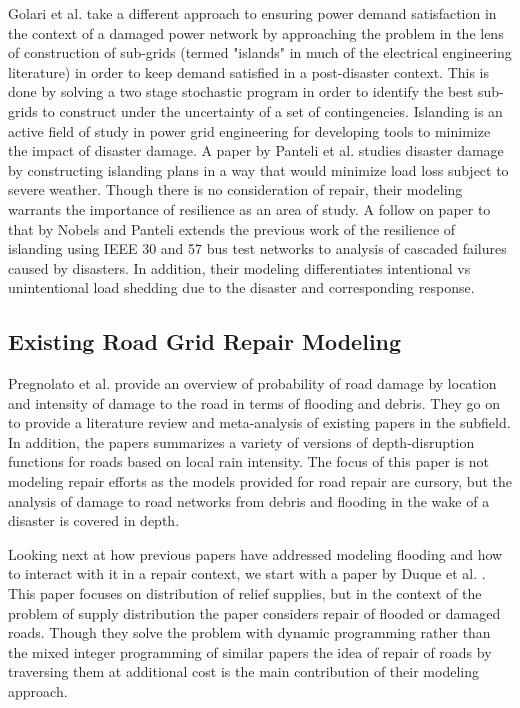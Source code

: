 \documentclass{article}
\begin{document}
		Golari et al. \cite{GolariEA2014} take a different approach to ensuring power demand satisfaction in the context of a damaged power network by approaching the problem in the lens of construction of sub-grids (termed "islands" in much of the electrical engineering literature) in order to keep demand satisfied in a post-disaster context. This is done by solving a two stage stochastic program in order to identify the best sub-grids to construct under the uncertainty of a set of contingencies. Islanding is an active field of study in power grid engineering for developing tools to minimize the impact of disaster damage. A paper by Panteli et al. \cite{Panteli2016} studies disaster damage by constructing islanding plans in a way that would minimize load loss subject to severe weather. Though there is no consideration of repair, their modeling warrants the importance of resilience as an area of study.  A follow on paper to that by Nobels and Panteli \cite{NobelsEA2019} extends the previous work of the resilience of islanding using IEEE 30 and 57 bus test networks to analysis of cascaded failures caused by disasters. In addition, their modeling differentiates intentional vs unintentional load shedding due to the disaster and corresponding response.
	\subsection{Existing Road Grid Repair Modeling}
		Pregnolato et al. \cite{PregnolatoEA2017} provide an overview of probability of road damage by location and intensity of damage to the road in terms of flooding and debris. They go on to provide a literature review and meta-analysis of existing papers in the subfield. In addition, the papers summarizes a variety of versions of depth-disruption functions for roads based on local rain intensity. The focus of this paper is not modeling repair efforts as the models provided for road repair are cursory, but the analysis of damage to road networks from debris and flooding in the wake of a disaster is covered in depth.
		
		Looking next at how previous papers have addressed modeling flooding and how to interact with it in a repair context, we start with a paper by Duque et al. \cite{DuqueEA2016}. This paper focuses on distribution of relief supplies, but in the context of the problem of supply distribution the paper considers repair of flooded or damaged roads. Though they solve the problem with dynamic programming rather than the mixed integer programming of similar papers the idea of repair of roads by traversing them at additional cost is the main contribution of their modeling approach.
		
\end{document}
